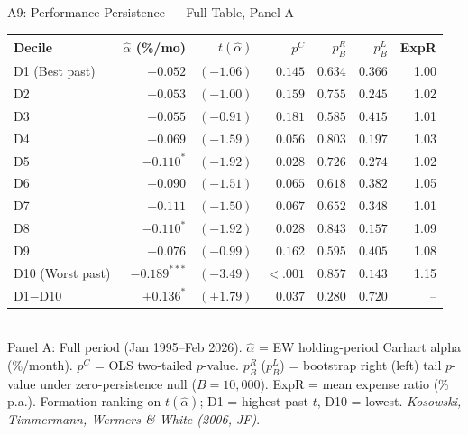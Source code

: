 \documentclass[10pt, aspectratio=169]{beamer}
\begin{document}
\begin{frame}{A9: Performance Persistence — Full Table, Panel A}
  \scriptsize
  \begin{tabular}{@{}lrrrrrr@{}}
    \toprule
    Decile & $\hat{\alpha}$ (\%/mo) & $t(\hat{\alpha})$ & $p^C$ & $p^R_B$ & $p^L_B$ & ExpR \\
    \midrule
    D1 (Best past)  & $-0.052$         & $(-1.06)$ & $0.145$  & $0.634$ & $0.366$ & 1.00 \\
    D2              & $-0.053$         & $(-1.00)$ & $0.159$  & $0.755$ & $0.245$ & 1.02 \\
    D3              & $-0.055$         & $(-0.91)$ & $0.181$  & $0.585$ & $0.415$ & 1.01 \\
    D4              & $-0.069$         & $(-1.59)$ & $0.056$  & $0.803$ & $0.197$ & 1.03 \\
    D5              & $-0.110^{*}$     & $(-1.92)$ & $0.028$  & $0.726$ & $0.274$ & 1.02 \\
    D6              & $-0.090$         & $(-1.51)$ & $0.065$  & $0.618$ & $0.382$ & 1.05 \\
    D7              & $-0.111$         & $(-1.50)$ & $0.067$  & $0.652$ & $0.348$ & 1.01 \\
    D8              & $-0.110^{*}$     & $(-1.92)$ & $0.028$  & $0.843$ & $0.157$ & 1.09 \\
    D9              & $-0.076$         & $(-0.99)$ & $0.162$  & $0.595$ & $0.405$ & 1.08 \\
    D10 (Worst past)& $-0.189^{***}$   & $(-3.49)$ & $<.001$  & $0.857$ & $\mathbf{0.143}$ & 1.15 \\
    \midrule
    D1$-$D10        & $+0.136^{*}$     & $(+1.79)$ & $0.037$  & $0.280$ & $0.720$ & -- \\
    \bottomrule
  \end{tabular}
  \vspace{4pt}\\
  \footnotesize Panel A: Full period (Jan 1995–Feb 2026). $\hat{\alpha}$ = EW holding-period
  Carhart alpha (\%/month). $p^C$ = OLS two-tailed $p$-value. $p^R_B$ ($p^L_B$) = bootstrap
  right (left) tail $p$-value under zero-persistence null ($B=10{,}000$). ExpR = mean expense
  ratio (\% p.a.). Formation ranking on $t(\hat{\alpha})$; D1 = highest past $t$, D10 = lowest.
  \textit{Kosowski, Timmermann, Wermers \& White (2006, JF)}.
\end{frame}

\end{document}

